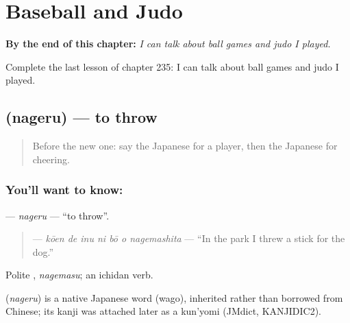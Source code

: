 
\chapter{Baseball and Judo}
\label{ch:ja-baseball-and-judo}

\begin{chapteropening}
\textbf{By the end of this chapter:} \emph{I can talk about ball games and judo I played.}

Complete the last lesson of chapter 235: I can talk about ball games and judo I played.
\end{chapteropening}

\section[\texorpdfstring{\ja{なげる} (nageru)}{なげる (nageru)}]{ (nageru) — to throw}

\label{lesson:JA-C235-nageru}



\begin{quote}
Before the new one: say the Japanese for a player, then the Japanese for cheering.
\end{quote}

\subsection*{You'll want to know: }
\textbf{} — \emph{nageru} — \textquotedblleft{}to throw\textquotedblright{}.

\begin{quote}
\textbf{   } — \emph{kōen de inu ni bō o nagemashita} — \textquotedblleft{}In the park I threw a stick for the dog.\textquotedblright{}
\end{quote}

Polite \textbf{}, \emph{nagemasu}; an ichidan verb.

\begin{cousinweb}
\textbf{} (\emph{nageru}) is a native Japanese word (wago), inherited rather than borrowed from Chinese; its kanji was attached later as a kun'yomi (JMdict, KANJIDIC2).
\end{cousinweb}

